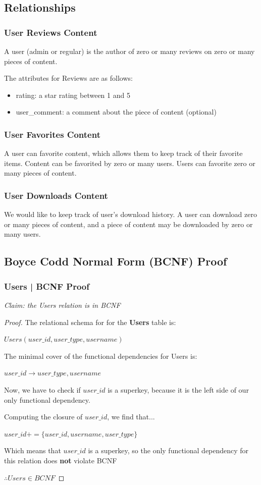 \documentclass[letter, 12pt, titlepage]{article}
\begin{document}
	\subsection{Relationships}
		\subsubsection{User Reviews Content}
			A user (admin or regular) is the author of zero or many reviews on zero or many pieces of content. 

			The attributes for Reviews are as follows:
			\begin{itemize}
				\item rating: a star rating between 1 and 5
				\item user\_comment: a comment about the piece of content (optional)
			\end{itemize}
		\subsubsection{User Favorites Content}
			A user can favorite content, which allows them to keep track of their favorite items. Content can be favorited by zero or many users. Users can favorite zero or many pieces of content.	
		\subsubsection{User Downloads Content}
			We would like to keep track of user's download history. A user can download zero or many pieces of content, and a piece of content may be downloaded by zero or many users.

\subsection{Boyce Codd Normal Form (BCNF) Proof}
		\subsubsection{Users | BCNF Proof }
		

		\textit{Claim: the Users relation is in BCNF}


		\begin{proof}


			The relational schema for for the \textbf{Users} table is:


		$ Users(user\_id, user\_type, username) $


		The minimal cover of the functional dependencies for Users is:


		$ user\_id \rightarrow user\_type, username $


		Now, we have to check if $user\_id$ is a superkey, because it is the left side of our only functional dependency.
		

		Computing the closure of $user\_id$, we find that...

		$user\_id+ = \{user\_id, username, user\_type\}$

		Which means that $user\_id$ is a superkey, so the only functional dependency for this relation does \textbf{not} violate BCNF

		$\therefore Users \in BCNF $	
		\end{proof}
\end{document}
